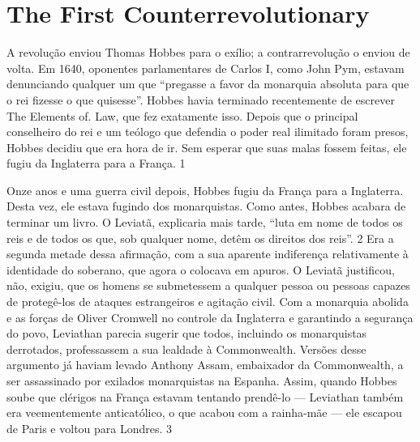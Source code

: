  
 \chapter{The First Counterrevolutionary}  

 \label{The First Counterrevolutionary}  
 
 
\par
 
 
 \textit{	}  

 
\par
 
 
 
\par
 

 \textbf{\textit{	} }  

 
\par
 
A revolução enviou Thomas Hobbes para o exílio; a contrarrevolução o enviou de volta. Em 1640, oponentes parlamentares de Carlos I, como John Pym, estavam denunciando qualquer um que “pregasse a favor da monarquia absoluta para que o rei fizesse o que quisesse”. Hobbes havia terminado recentemente de escrever The Elements of. Law, que fez exatamente isso. Depois que o principal conselheiro do rei e um teólogo que defendia o poder real ilimitado foram presos, Hobbes decidiu que era hora de ir. Sem esperar que suas malas fossem feitas, ele fugiu da Inglaterra para a França.
 {\color{blue} 1}  

 
\par
 
Onze anos e uma guerra civil depois, Hobbes fugiu da França para a Inglaterra. Desta vez, ele estava fugindo dos monarquistas. Como antes, Hobbes acabara de terminar um livro. O Leviatã, explicaria mais tarde, “luta em nome de todos os reis e de todos os que, sob qualquer nome, detêm os direitos dos reis”.
 {\color{blue} 2}  
Era a segunda metade dessa afirmação, com a sua aparente indiferença relativamente à identidade do soberano, que agora o colocava em apuros. O Leviatã justificou, não, exigiu, que os homens se submetessem a qualquer pessoa ou pessoas capazes de protegê-los de ataques estrangeiros e agitação civil. Com a monarquia abolida e as forças de Oliver Cromwell no controle da Inglaterra e garantindo a segurança do povo, Leviathan parecia sugerir que todos, incluindo os monarquistas derrotados, professassem a sua lealdade à Commonwealth. Versões desse argumento já haviam levado Anthony Assam, embaixador da Commonwealth, a ser assassinado por exilados monarquistas na Espanha. Assim, quando Hobbes soube que clérigos na França estavam tentando prendê-lo — Leviathan também era veementemente anticatólico, o que acabou com a rainha-mãe — ele escapou de Paris e voltou para Londres.
 {\color{blue} 3}  

